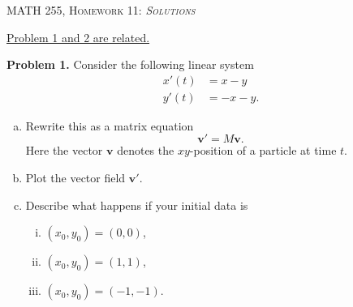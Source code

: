 \documentclass[12pt]{report} %
\theoremstyle{definition}
\begin{document}
\begin{center}
   \textsc{\large MATH 255, Homework 11: \emph{Solutions}}\\
\end{center}
\vspace{.5cm}

\begin{center}
\underline{Problem 1 and 2 are related.}
\end{center}
\noindent\textbf{Problem 1.} Consider the following linear system 
\begin{align*}
    x'(t) &= x-y \\
    y'(t) &= -x-y.
\end{align*}
\begin{enumerate}[(a)]
    \item Rewrite this as a matrix equation
    \[
    \mathbf{v}' = M\mathbf{v}.
    \]
    Here the vector $\mathbf{v}$ denotes the $xy$-position of a particle at time $t$.
    \item Plot the vector field $\mathbf{v}'$.
    \item Describe what happens if your initial data is
    \begin{enumerate}[i.]
        \item $(x_0,y_0)=(0,0)$,
        \item $(x_0,y_0)=(1,1)$,
        \item $(x_0,y_0)=(-1,-1)$.
    \end{enumerate}
\end{enumerate}
\end{document}
